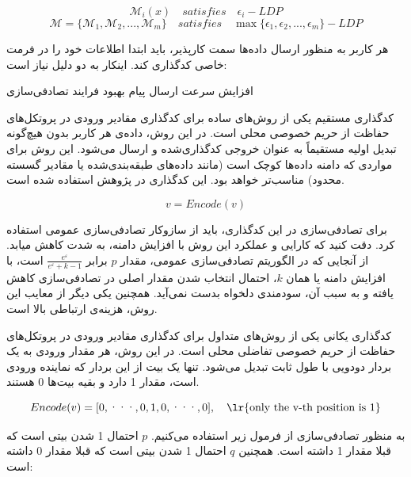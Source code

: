 $$\mathcal{M}_i(x) \quad satisfies \quad \epsilon_i{-}LDP$$
$$ \mathcal{M} = \{ \mathcal{M}_1 , \mathcal{M}_2 , ... , \mathcal{M}_m \} \quad satisfies \quad \max \{ \epsilon_1 , \epsilon_2 , ... , \epsilon_m \}{-}LDP$$


هر کاربر به منظور ارسال داده‌ها سمت کارپذیر، باید ابتدا اطلاعات خود را در فرمت خاصی کدگذاری کند. اینکار به دو دلیل نیاز است:

 افزایش سرعت ارسال پیام
 بهبود فرایند تصادفی‌سازی


کدگذاری مستقیم یکی از روش‌های ساده برای کدگذاری مقادیر ورودی در پروتکل‌های حفاظت از حریم خصوصی محلی است. در این روش، داده‌ی هر کاربر بدون هیچ‌گونه تبدیل اولیه مستقیماً به عنوان خروجی کدگذاری‌شده و ارسال می‌شود. این روش برای مواردی که دامنه داده‌ها کوچک است (مانند داده‌های طبقه‌بندی‌شده یا مقادیر گسسته محدود) مناسب‌تر خواهد بود. این کدگذاری در پژوهش  استفاده شده است.

\begin{equation}
 v = Encode(v)
\end{equation}

برای تصادفی‌سازی در این کدگذاری، باید از سازوکار تصادفی‌سازی عمومی استفاده کرد. دقت کنید که کارایی و عملکرد این روش با افزایش دامنه، به شدت کاهش میابد. از آنجایی که در الگوریتم تصادفی‌سازی عمومی، مقدار $p$ برابر $\frac{e^{\varepsilon}}{e^{\varepsilon}+k-1}$ است، با افزایش دامنه یا همان $k$، احتمال انتخاب شدن مقدار اصلی در تصادفی‌سازی کاهش یافته و به سبب آن، سودمندی دلخواه بدست نمی‌آید. همچنین یکی دیگر از معایب این روش، هزینه‌ی ارتباطی بالا است.


کدگذاری یکانی یکی از روش‌های متداول برای کدگذاری مقادیر ورودی در پروتکل‌های حفاظت از حریم خصوصی تفاضلی محلی است. در این روش، هر مقدار ورودی به یک بردار دودویی با طول ثابت تبدیل می‌شود. تنها یک بیت از این بردار که نماینده ورودی است، مقدار 1 دارد و بقیه بیت‌ها 0 هستند.

\begin{equation}
Encode(v) = [0, \text{···} ,0,1,0, \text{···} , 0], \quad \text{\lr{only the v-th position is 1}}
\end{equation}

به منظور تصادفی‌سازی از فرمول زیر استفاده می‌کنیم. $p$ احتمال 1 شدن بیتی است که قبلا مقدار 1 داشته است. همچنین $q$ احتمال 1 شدن بیتی است که قبلا مقدار 0 داشته است:

